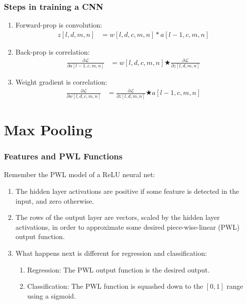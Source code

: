 \documentclass{beamer}
\begin{document}
\begin{frame}
  \frametitle{Steps in training a CNN}
  \begin{enumerate}
  \item Forward-prop is convolution:
    \begin{align*}
      z[l,d,m,n] &= w[l,d,c,m,n] \ast a[l-1,c,m,n]
    \end{align*}
  \item Back-prop is correlation:
    \begin{align*}
      \frac{\partial{\mathcal L}}{\partial a[l-1,c,m,n]} &=
      w[l,d,c,m,n] \bigstar \frac{\partial{\mathcal L}}{\partial z[l,d,m,n]}
    \end{align*}
  \item Weight gradient is correlation:
    \begin{align*}
      \frac{\partial{\mathcal L}}{\partial w[l,d,c,m,n]} &=
      \frac{\partial{\mathcal L}}{\partial z[l,d,m,n]} \bigstar a[l-1,c,m,n]
    \end{align*}
  \end{enumerate}
\end{frame}

\section{Max Pooling}
\setcounter{subsection}{1}

\begin{frame}
  \frametitle{Features and PWL Functions}

  Remember the PWL model of a ReLU neural net:
  \begin{enumerate}
  \item The hidden layer activations are positive if some feature is
    detected in the input, and zero otherwise.
  \item The rows of the output layer are vectors, scaled by the hidden
    layer activations, in order to approximate some desired
    piece-wise-linear (PWL) output function.
  \item What happens next is different for regression and
    classification:
    \begin{enumerate}
    \item Regression: The PWL output function is the desired output.
    \item Classification: The PWL function is squashed down to the
      $[0,1]$ range using a sigmoid.
    \end{enumerate}
  \end{enumerate}
\end{frame}
       
\end{document}
